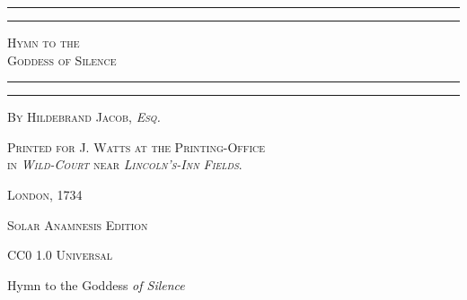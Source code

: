 \documentclass[a4paper, 11pt, oneside]{article}
\begin{document}
\bfseries
{}
\pagestyle{plain}
\begin{titlepage} %
	\centering %

	
	\rule{\textwidth}{1.6pt}\vspace*{-\baselineskip}\vspace*{2pt} %
	\rule{\textwidth}{0.4pt} %
	
	{\scshape\LARGE Hymn to the \\ Goddess of Silence}
	
	\rule{\textwidth}{0.4pt}\vspace*{-\baselineskip}\vspace{3.2pt} %
	\rule{\textwidth}{1.6pt} %

	
	\vspace{1\baselineskip}
	
	{\scshape By \large Hildebrand Jacob, \emph{Esq.}} %
	





	
	


\vspace*{\fill}

	\vspace{1\baselineskip}

	{\footnotesize\scshape Printed for J. Watts at the Printing-Office \\ in \emph{Wild-Court} near \emph{Lincoln's-Inn Fields}.}
	
	{\small\scshape{London, 1734}}
	
	\vspace{0.5\baselineskip} %



\scshape Solar Anamnesis Edition
	
	{\scshape\small CC0 1.0 Universal} %
\end{titlepage}
\setlength{\parskip}{1mm plus1mm minus1mm}
\setcounter{tocdepth}{3}
\setcounter{secnumdepth}{3}
\clearpage
\begin{center}\large
Hymn to the Goddess \emph{of Silence}
\end{center}
\end{document}
